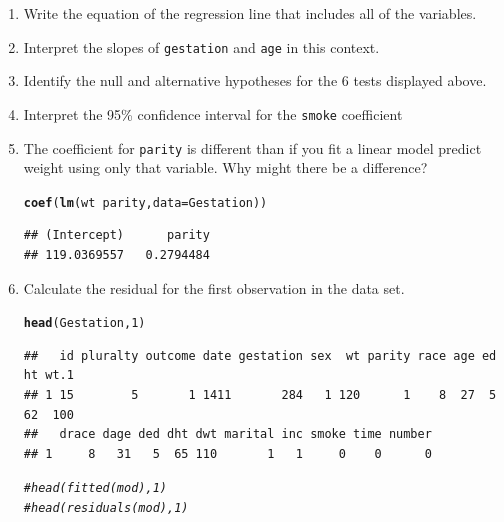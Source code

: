 \documentclass[10pt]{article}\usepackage[]{graphicx}\usepackage[]{color}
\makeatletter
\newcommand{\hlnum}[1]{\textcolor[rgb]{0.686,0.059,0.569}{#1}}%
\newcommand{\hlcom}[1]{\textcolor[rgb]{0.678,0.584,0.686}{\textit{#1}}}%
\newcommand{\hlopt}[1]{\textcolor[rgb]{0,0,0}{#1}}%
\newcommand{\hlstd}[1]{\textcolor[rgb]{0.345,0.345,0.345}{#1}}%
\newcommand{\hlkwc}[1]{\textcolor[rgb]{0.333,0.667,0.333}{#1}}%
\newcommand{\hlkwd}[1]{\textcolor[rgb]{0.737,0.353,0.396}{\textbf{#1}}}%
\newenvironment{kframe}{%
 \def\at@end@of@kframe{}%
 \ifinner\ifhmode%
  \def\at@end@of@kframe{\end{minipage}}%
  \begin{minipage}{\columnwidth}%
 \fi\fi%
 \def\FrameCommand##1{\hskip\@totalleftmargin \hskip-\fboxsep
 \colorbox{shadecolor}{##1}\hskip-\fboxsep
     \hskip-\linewidth \hskip-\@totalleftmargin \hskip\columnwidth}%
 \MakeFramed {\advance\hsize-\width
   \@totalleftmargin\z@ \linewidth\hsize
   \@setminipage}}%
 {\par\unskip\endMakeFramed%
 \at@end@of@kframe}
\newenvironment{knitrout}{}{} %
\makeatother
\begin{document}
\begin{enumerate}
  \itemsep0.7in
  \item Write the equation of the regression line that includes all of the variables.
  \item Interpret the slopes of \texttt{gestation} and \texttt{age} in this context.
  \item Identify the null and alternative hypotheses for the 6 tests displayed above. 
  \newpage
  \item Interpret the 95\% confidence interval for the {\tt smoke} coefficient
  \item The coefficient for \texttt{parity} is different than if you fit a linear model predict weight using only that variable. Why might there be a difference?
\begin{knitrout}\footnotesize
{}\color{fgcolor}\begin{kframe}
\begin{alltt}
\hlkwd{coef}\hlstd{(}\hlkwd{lm}\hlstd{(wt} \hlopt{~} \hlstd{parity,} \hlkwc{data} \hlstd{= Gestation))}
\end{alltt}
\begin{verbatim}
## (Intercept)      parity 
## 119.0369557   0.2794484
\end{verbatim}
\end{kframe}
\end{knitrout}
  
  \item Calculate the residual for the first observation in the data set.
\begin{knitrout}\footnotesize
{}\color{fgcolor}\begin{kframe}
\begin{alltt}
\hlkwd{head}\hlstd{(Gestation,} \hlnum{1}\hlstd{)}
\end{alltt}
\begin{verbatim}
##   id pluralty outcome date gestation sex  wt parity race age ed ht wt.1
## 1 15        5       1 1411       284   1 120      1    8  27  5 62  100
##   drace dage ded dht dwt marital inc smoke time number
## 1     8   31   5  65 110       1   1     0    0      0
\end{verbatim}
\begin{alltt}
\hlcom{# head(fitted(mod), 1)}
\hlcom{# head(residuals(mod), 1)}
\end{alltt}
\end{kframe}
\end{knitrout}
  

\end{enumerate}
\end{document}
